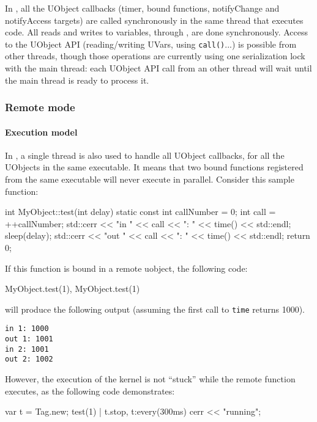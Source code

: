 In , all the UObject callbacks (timer, bound
functions, notifyChange and notifyAccess targets) are called
synchronously in the same thread that executes \us code. All reads and
writes to \urbi variables, through , are done
synchronously. Access to the UObject API (reading/writing UVars, using
\lstinline|call()|...) is possible from other threads, though those
operations are currently using one serialization lock with the main
thread: each UObject API call from an other thread will wait until the
main thread is ready to process it.


\subsubsection{Remote mode}

\paragraph{Execution model}

In , a single thread is also used to handle all
UObject callbacks, for all the UObjects in the same executable. It
means that two bound functions registered from the same executable
will never execute in parallel. Consider this sample \Cxx function:

\begin{cxx}
int MyObject::test(int delay)
{
  static const int callNumber = 0;
  int call = ++callNumber;
  std::cerr << "in "  << call << ": " << time() << std::endl;
  sleep(delay);
  std::cerr << "out " << call << ": " << time() << std::endl;
  return 0;
}
\end{cxx}

If this function is bound in a remote uobject, the following code:

\begin{cxx}
MyObject.test(1), MyObject.test(1)
\end{cxx}

\noindent
will produce the following output (assuming the first call to
\lstinline|time| returns 1000).

\begin{lstlisting}
in 1: 1000
out 1: 1001
in 2: 1001
out 2: 1002
\end{lstlisting}

However, the execution of the \urbi kernel is not ``stuck'' while the
remote function executes, as the following code demonstrates:

\begin{urbiunchecked}
var t = Tag.new;
test(1) | t.stop,
t:every(300ms)
  cerr << "running";
\end{urbiunchecked}

